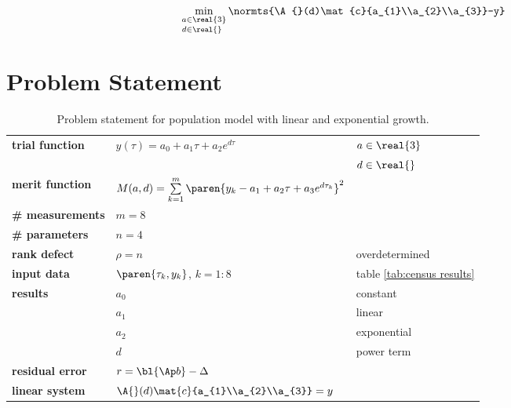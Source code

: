   \begin{equation} %
      \min_{\substack{a\in\real{3}\\d\in\real{}\phantom{^{3}}}} \normts{\A{}(d)\mat{c}{a_{1}\\a_{2}\\a_{3}}-y}
  \end{equation}
\section{Problem Statement}  %

  \begin{table}[t]  %
    \caption{Problem statement for population model with linear and exponential growth.}
    \begin{center}
      \begin{tabular}{lll}
        \bf{trial function} & $y(\tau) = a_{0} + a_{1} \tau + a_{2} e^{d \tau}$ & $a\in\real{3}$ \\
        && $d\in\real{}$ \\
        \bf{merit function} & $M(a,d) = \sum\limits_{k=1}^{m}\paren{y_{k} - a_{1} + a_{2} \tau + a_{3} e^{d \tau_{k}}}^{2}$ \\
        \bf{\# measurements}& $m = 8$ \\
        \bf{\# parameters}  & $n = 4$ \\
        \bf{rank defect}    & $\rho = n$ & overdetermined \\
        \bf{input data}     & $\paren{\tau_{k}, y_{k}}$, $k=1\colon 8$ & table \ref{tab:census results}\\
        \bf{results}        & $a_{0}$ & constant\\
                            & $a_{1}$ & linear\\
                            & $a_{2}$ & exponential\\
                            & $d$      & power term\\
        \bf{residual error} & $r = \bl{\Ap b} - \Delta$ \\
        \bf{linear system}  & $\A{}(d)\mat{c}{a_{1}\\a_{2}\\a_{3}} = y$ \\
      \end{tabular}
    \end{center}
  \label{tab:census problem statement}
  \end{table}%

